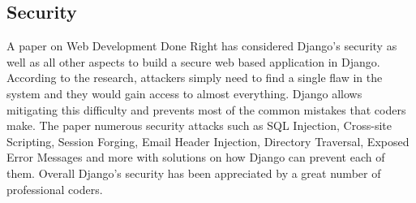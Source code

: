 \documentclass[../main.tex]{subfiles}
\begin{document}
\subsection{Security}
A paper on Web Development Done Right\cite{Holovaty2007TheDG} has considered Django's security as well as all other aspects to build a secure web based application in Django. According to the research, attackers simply need to find a single flaw in the system and they would gain access to almost everything. Django allows mitigating this difficulty and prevents most of the common mistakes that coders make. The paper numerous security attacks such as SQL Injection, Cross-site Scripting, Session Forging, Email Header Injection, Directory Traversal, Exposed Error Messages and more with solutions on how Django can prevent each of them. Overall Django's security has been appreciated by a great number of professional coders. 
\end{document}
